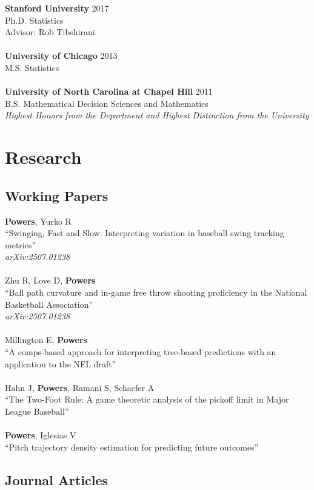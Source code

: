 \documentclass{article}
\begin{document}
{\bf Stanford University} \hfill 2017\\
Ph.D. Statistics\\
Advisor: Rob Tibshirani\\
~\\
{\bf University of Chicago} \hfill 2013\\
M.S. Statistics\\
~\\
{\bf University of North Carolina at Chapel Hill} \hfill 2011\\
B.S. Mathematical Decision Sciences and Mathematics\\
{\it Highest Honors from the Department and Highest Distinction from the University}


\section*{\sc Research}

\subsection*{\sc Working Papers}

{\bf Powers}, Yurko R\\
``Swinging, Fast and Slow: Interpreting variation in baseball swing tracking metrics''\\
{\it arXiv:2507.01238}\\
~\\
Zhu R, Love D, {\bf Powers}\\
``Ball path curvature and in-game free throw shooting proficiency in the National Basketball Association''\\
{\it arXiv:2507.01238}\\
~\\
Millington E, {\bf Powers}\\
``A comps-based approach for interpreting tree-based predictions with an application to the NFL draft''\\
~\\
Hahn J, {\bf Powers}, Ramani S, Schaefer A\\
``The Two-Foot Rule: A game theoretic analysis of the pickoff limit in Major League Baseball''\\
~\\
{\bf Powers}, Iglesias V\\
``Pitch trajectory density estimation for predicting future outcomes''

\subsection*{\sc Journal Articles}
\end{document}
